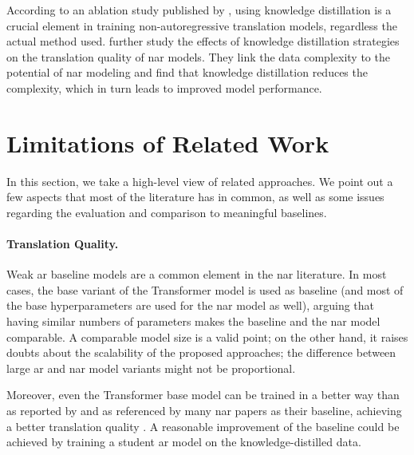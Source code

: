 According to an ablation study published by \citet{gu-kong-2021-fully}, using
knowledge distillation is a crucial element in training non-autoregressive
translation models, regardless the actual method used.
\citet{zhou-etal-2020-understanding} further study the effects of knowledge
distillation strategies on the translation quality of \ac{nar} models. They
link the data complexity to the potential of \ac{nar} modeling and find that
knowledge distillation reduces the complexity, which in turn leads to improved
model performance.


\section{Limitations of Related Work}%
\label{sec:nat:discussion}

In this section, we take a high-level view of related approaches. We point out
a few aspects that most of the literature has in common, as well as some issues
regarding the evaluation and comparison to meaningful baselines.

\paragraph{Translation Quality.} Weak \acl{ar} baseline models are a common
element in the \acl{nar} literature. In most cases, the base variant of the
Transformer model is used as baseline (and most of the base hyperparameters are
used for the \ac{nar} model as well), arguing that having similar numbers of
parameters makes the baseline and the \ac{nar} model comparable. A comparable
model size is a valid point; on the other hand, it raises doubts about the
scalability of the proposed approaches; the difference between large \ac{ar}
and \ac{nar} model variants might not be proportional.

Moreover, even the Transformer base model can be trained in a better way than
as reported by \citet{vaswani2017attention} and as referenced by many \ac{nar}
papers as their baseline, achieving a better translation quality
\citep{popel-bojar-2018-training}. A reasonable improvement of the baseline
could be achieved by training a student \ac{ar} model on the
knowledge-distilled data.

